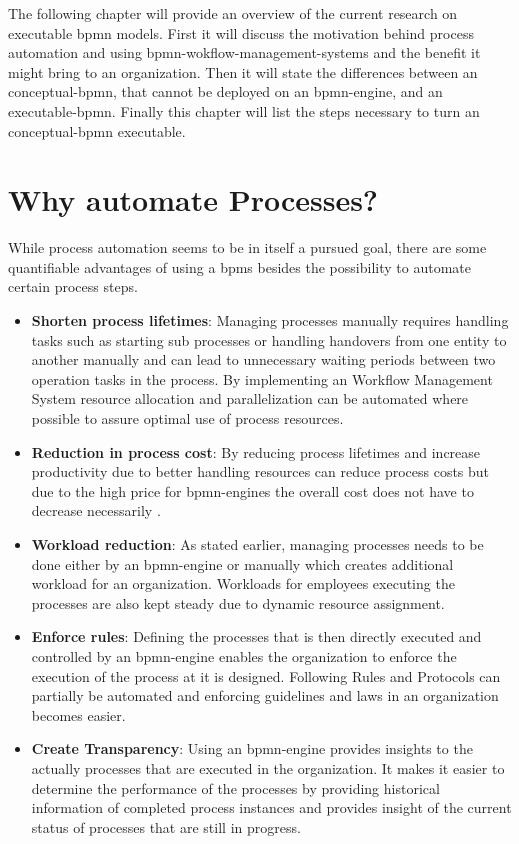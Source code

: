 
The following chapter will provide an overview of the current research on executable \gls{bpmn} models. First it will discuss the motivation behind process automation and using \gls{bpmn-wokflow-management-system}s and the benefit it might bring to an organization. Then it will state the differences between an \gls{conceptual-bpmn}, that cannot be deployed on an \gls{bpmn-engine}, and an \gls{executable-bpmn}. Finally this chapter will list the steps necessary to turn an \gls{conceptual-bpmn} executable.

\section{Why automate Processes?}
While process automation seems to be in itself a pursued goal, there are some quantifiable advantages of using a \gls{bpms} besides the possibility to automate certain process steps.
\begin{itemize}
	\item \textbf{Shorten process lifetimes}: Managing processes manually requires handling tasks such as starting sub processes or handling handovers from one entity to another manually and can lead to unnecessary waiting periods between two operation tasks in the process. By implementing an Workflow Management System resource allocation and parallelization can be automated where possible to assure optimal use of process resources. \cite{gadatsch2020grundkurs}
	
	\item \textbf{Reduction in process cost}: By reducing process lifetimes and increase productivity due to better handling resources can reduce process costs \cite{gadatsch2020grundkurs} but due to the high price for \gls{bpmn-engine}s the overall cost does not have to decrease necessarily \cite{gruber2009profitability}.
	
	\item \textbf{Workload reduction}: As stated earlier, managing processes needs to be done either by an \gls{bpmn-engine} or manually which creates additional workload for an organization. Workloads for employees executing the processes are also kept steady due to dynamic resource assignment. \cite{fundamentals}\cite{gadatsch2020grundkurs}
	
	\item \textbf{Enforce rules}: Defining the processes that is then directly executed and controlled by an \gls{bpmn-engine} enables the organization to enforce the execution of the process at it is designed. Following Rules and Protocols can partially be automated and enforcing guidelines and laws in an organization becomes easier. \cite{fundamentals}
	
	\item \textbf{Create Transparency}: Using an \gls{bpmn-engine} provides insights to the actually processes that are executed in the organization. It makes it easier to determine the performance of the processes by providing historical information of completed process instances and provides insight of the current status of processes that are still in progress. \cite{gadatsch2020grundkurs}
\end{itemize}

